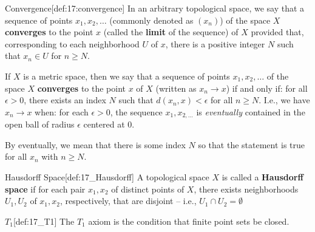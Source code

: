 \begin{defBox}{Convergence}[def:17:convergence]
    In an arbitrary topological space, we say that a sequence of points 
    \( x_{ 1 }, x_{ 2 }, \ldots \) (commonly denoted as \( ( x_{ n } ) \)) of 
    the space \( X \) \textbf{converges}
    to the point \( x \) (called the \textbf{limit} of the sequence) of \( X \) 
    provided that, corresponding to each 
    neighborhood \( U \) of \( x \), there is a positive integer \( N \)
    such that \( x_{ n } \in U \) for \( n \geq N \).


    \baseSkip 

    If \( X \) is a metric space, then we say that a sequence of points 
    \( x_{ 1 }, x_{ 2 }, \ldots \) of the space \( X \) \textbf{converges}
    to the point \( x \) of \( X \) (written as \( x_{ n } \rightarrow x \))
    if and only if: for all \( \epsilon > 0 \), there exists an index \( N \)
    such that \( d ( x_{ n }, x ) < \epsilon \) for all \( n \geq N \).
    I.e., we have \( x_{ n } \rightarrow x \) when: for each \( \epsilon > 0 \),
    the sequence \( x_{ 1 }, x_{ 2, \ldots } \) is \textit{eventually} contained
    in the open ball of radius \( \epsilon \) centered at \( 0 \).
    
    \baseSkip 

    By eventually, we mean that there is some index \( N \) so that the 
    statement is true for all \( x_{ n } \) with \( n \geq N \).
\end{defBox}

\begin{defBox}{Hausdorff Space}[def:17_Hausdorff]
    A topological space \( X \) is called a \textbf{Hausdorff space} if for each
    pair \( x_{ 1 }, x_{ 2 } \) of distinct points of \( X \), there exists 
    neighborhoods \( U_{ 1 }, U_{ 2 } \) of \( x_{ 1 }, x_{ 2 } \), 
    respectively, that are disjoint -- i.e., \( U_{ 1 } \cap U_{ 2 } = 
    \emptyset \)
\end{defBox}

\begin{defBox}{\( T_{ 1 } \)}[def:17_T1]
    The \( T_{ 1 } \) axiom is the condition that finite point sets be closed.
\end{defBox}